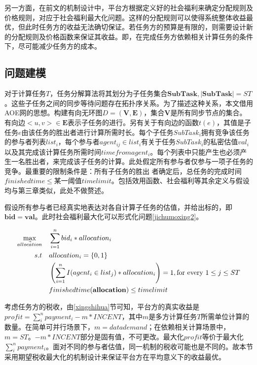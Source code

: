 \documentclass[promaster]{thesis-uestc}
\begin{document}
另一方面，在前文的机制设计中，平台方根据定义好的社会福利来确定分配规则及价格规则，对应于社会福利最大化问题。这样的分配规则可以使得系统整体收益最优，但此时任务方的收益无法确切保证。若任务方的预算是有限的，则需要设计新的分配规则及价格函数来保证其收益。即，在完成任务方依赖相关计算任务的条件下，尽可能减少任务方的成本。

\FloatBarrier

\subsection{问题建模}

对于计算任务$T$，任务分解算法将其划分为子任务集合$\mathbf{SubTask},|\mathbf{SubTask}| = ST$。这些子任务之间的同步等待问题存在拓扑序关系。为了描述这种关系，本文借用AOE网的思想。构建有向无环图$D=(\mathbf{V},\mathbf{E})$，集合$\mathbf{V}$是所有同步节点的集合。有向边$<u,v> \in \mathbf{E}$表示子任务的进行。另有关于有向边的函数$t(e)$，其值是子任务$e$由该任务的胜出者进行计算所需时长。每个子任务$SubTask_i$拥有竞争该任务的参与者列表$list_i$，每个参与者$agent_{ij} \in list_i$有关于任务$SubTask_i$的私密估值$val_i$以及其完成该计算任务所需时间$timefromagent_i$。每个列表中只能产生也必须产生一名胜出者，来完成该子任务的计算。此处假定所有参与者仅参与一项子任务的竞争。最重要的限制条件是：所有子任务的胜出
者确定后，总任务的完成时间$finishedtime \leq $某一阈值$timelimit$。包括效用函数、社会福利等其余定义与假设均与第三章类似，此处不做赘述。

假设所有参与者已经真实地表达对各自计算子任务的估值，并给出标的，即$\mathbf{bid}=\mathbf{val}$。此时社会福利最大化可以形式化问题\ref{jichumoxing2}。

\begin{align}
    \label{jichumoxing2}
    \max_{\vec{allocation}} \quad&\sum_{i=1}^{n}{bid_i*allocation_i}\\
    s.t                     \quad&allocation_i = \{0,1\}\notag\\
    \quad&\left(\sum_{i=1}^{n}{I(agent_i \in list_j)*allocation_i}\right) = 1,\text{for every }1 \leq j \leq ST\notag\\
    \quad&finishedtime(\mathbf{allocation}) \leq timelimit
    \notag
\end{align}


考虑任务方的税收，由\ref{xingshihua}节可知，平台方的真实收益是$profit = \sum_{i}^{n}{payment_i}-m*INCENT$，其中$m$是多方计算任务$T$所需单位计算的数量。在简单可并行场景下，$m=datademand$；在依赖相关计算场景中，$m=ST$。$-m*INCENT$部分是固有值，不可更改。最大化$profit$等价于最大化$\sum_{i}^{n}{payment_i}$。面对不同的参与者估值，同一机制的税收可能也是不同的。故本节采用期望税收最大化的机制设计来保证平台方在平均意义下的收益最优。
\end{document}
